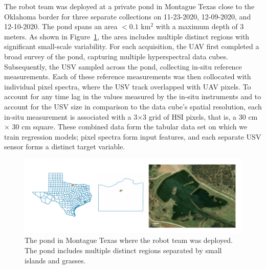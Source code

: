 \documentclass[remotesensing,article,submit,pdftex,moreauthors]{Definitions/mdpi}
\begin{document}
The robot team was deployed at a private pond in Montague Texas close to the Oklahoma border for three separate collections on 11-23-2020, 12-09-2020, and 12-10-2020. The pond spans an area $<0.1$ km$^{2}$ with a maximum depth of 3 meters. As shown in Figure~\ref{fig:study-area}, the area includes multiple distinct regions with significant small-scale variability. For each acquisition, the UAV first completed a broad survey of the pond, capturing multiple hyperspectral data cubes. Subsequently, the USV sampled across the pond, collecting in-situ reference measurements. Each of these reference measurements was then collocated with individual pixel spectra, where the USV track overlapped with UAV pixels. To account for any time lag in the values measured by the in-situ instruments and to account for the USV size in comparison to the data cube's spatial resolution, each in-situ measurement is associated with a 3$\times$3 grid of HSI pixels, that is, a 30 cm $\times$ 30 cm square. These combined data form the tabular data set on which we train regression models; pixel spectra form input features, and each separate USV sensor forms a distinct target variable.

\begin{figure}[t!]
\centering
\vspace{-0.3in}
\includegraphics[width=\columnwidth]{paper/figures/materials-and-methods/study-area.pdf}
\vspace{-0.3in}
\caption{The pond in Montague Texas where the robot team was deployed. The pond includes multiple distinct regions separated by small islands and grasses. \label{fig:study-area}}
\end{figure}  
\end{document}
